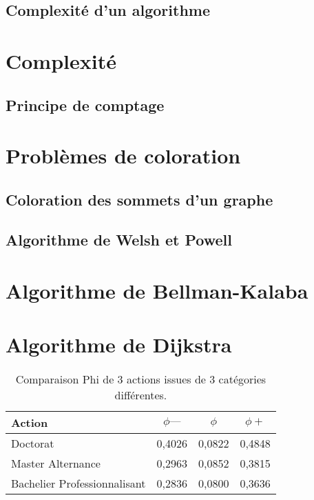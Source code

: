 \subsection{Complexité d'un algorithme}\label{subsec:complexitéalgo}
\section{Complexité}\label{sec:complexité}
\subsection{Principe de comptage}\label{subsec:comptage}

\section{Problèmes de coloration}\label{sec:coloration}
\subsection{Coloration des sommets d'un graphe}\label{subsec:sommets}
\subsection{Algorithme de Welsh et Powell}\label{subsec:algowelshpowell}
\section{Algorithme de Bellman-Kalaba}\label{sec:algobellmankalaba}
\section{Algorithme de Dijkstra}\label{sec:algodijkstra}

\begin{table}[h!]
	\begin{center}
		\caption{Comparaison Phi de 3 actions issues de 3 catégories différentes.}
		\label{tbl:phidocaltpro}
		\begin{tabular}{|l|S[table-format=1.4]|S[table-format=1.4]|S[table-format=1.4]|}
			\toprule
			\textbf{Action} & \textbf{$\phi—$} & \textbf{$\phi$} & \textbf{$\phi+$}\\
			\midrule
			Doctorat & 0,4026 & 0,0822 & 0,4848\\
			Master Alternance & 0,2963 & 0,0852 & 0,3815\\
			Bachelier Professionnalisant & 0,2836 & 0,0800 & 0,3636\\
			\bottomrule
		\end{tabular}
	\end{center}
\end{table}
